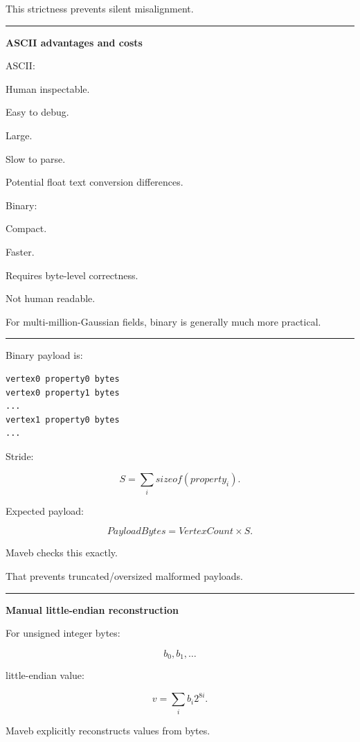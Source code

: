 This strictness prevents silent misalignment.

\begin{center}\rule{0.5\linewidth}{0.5pt}\end{center}

\textbf{ASCII advantages and costs}

ASCII:

Human inspectable.

Easy to debug.

Large.

Slow to parse.

Potential float text conversion differences.

Binary:

Compact.

Faster.

Requires byte-level correctness.

Not human readable.

For multi-million-Gaussian fields, binary is generally much more practical.

\begin{center}\rule{0.5\linewidth}{0.5pt}\end{center}

Binary payload is:

\protect{}\label{j6pgmr}%
\begin{verbatim}
vertex0 property0 bytes
vertex0 property1 bytes
...
vertex1 property0 bytes
...
\end{verbatim}

Stride:

\[
S=
\sum_i
sizeof(property_i).
\]

Expected payload:

\[
PayloadBytes
=
VertexCount\times S.
\]

Maveb checks this exactly.

That prevents truncated/oversized malformed payloads.

\begin{center}\rule{0.5\linewidth}{0.5pt}\end{center}

\textbf{Manual little-endian reconstruction}

For unsigned integer bytes:

\[
b_0,b_1,\dots
\]

little-endian value:

\[
v=
\sum_i
b_i2^{8i}.
\]

Maveb explicitly reconstructs values from bytes.

